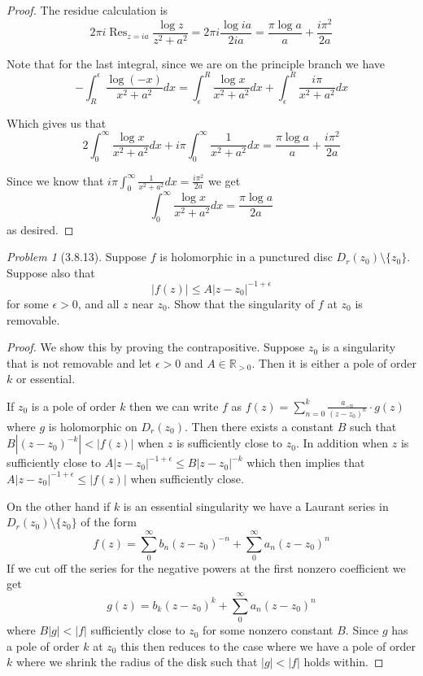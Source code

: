 \documentclass[10pt]{article}
\newcommand{\sk}{\vskip 10mm}
\newcommand{\bb}[1]{\mathbb{#1}}
\DeclareMathOperator{\Res}{Res}
\theoremstyle{remark}
\newtheorem{problem}{Problem}
\theoremstyle{remark}
\begin{document}
\begin{proof}
  The residue calculation is
  \[
    2\pi i\Res_{z=ia}\frac{\log z}{z^2+a^2}= 2\pi i\frac{\log ia}{2ia} = \frac{\pi\log a}{a}+\frac{i\pi^2}{2a}
  \]

  Note that for the last integral, since we are on the principle branch we have
  \[
    -\int_{R}^{\epsilon}\frac{\log (-x)}{x^2+a^2}dx =\int_\epsilon^R\frac{\log x}{x^2+a^2}dx+\int_\epsilon^R\frac{i\pi}{x^2+a^2}dx
  \]
  
  Which gives us that
  \[
    2\int_0^\infty\frac{\log x}{x^2+a^2}dx+i\pi\int_0^\infty\frac{1}{x^2+a^2}dx = \frac{\pi\log a}{a}+\frac{i\pi^2}{2a}
  \]

  Since we know that $i\pi\int_0^\infty\frac{1}{x^2+a^2}dx = \frac{i\pi^2}{2a}$ we get
  \[
    \int_0^\infty\frac{\log x}{x^2+a^2}dx=\frac{\pi\log a}{2a}
  \]
  as desired.
\end{proof}

\sk

\begin{problem}[3.8.13]
  Suppose $f$ is holomorphic in a punctured disc $D_r(z_0)\setminus\{z_0\}$.
  Suppose also that
  \[
    |f(z)|\leq A|z-z_0|^{-1+\epsilon}
  \]
  for some $\epsilon>0$, and all $z$ near $z_0$. Show that the singularity
  of $f$ at $z_0$ is removable.
\end{problem}

\begin{proof}
  We show this by proving the contrapositive. Suppose $z_0$ is a singularity
  that is not removable and let $\epsilon>0$ and $A\in\bb{R}_{>0}$.
  Then it is either a pole of order $k$ or essential.

  If $z_0$ is a pole of order $k$ then we can write $f$ as
  $f(z)=\sum_{n=0}^k\frac{a_{-n}}{(z-z_0)^{n}}\cdot g(z)$ where $g$ is holomorphic on
  $D_r(z_0)$. Then there exists a constant $B$ such that $B|(z-z_0)^{-k}|<|f(z)|$
  when $z$ is sufficiently close to $z_0$. In addition when $z$ is sufficiently
  close to $A|z-z_0|^{-1+\epsilon}\leq B|z-z_0|^{-k}$ which then implies that
  $A|z-z_0|^{-1+\epsilon}\leq|f(z)|$ when sufficiently close.

  On the other hand if $k$ is an essential singularity we have a Laurant
  series in $D_r(z_0)\setminus\{z_0\}$ of the form
  \[
    f(z)=\sum_0^\infty b_n(z-z_0)^{-n} +\sum_0^\infty a_n(z-z_0)^n
  \]
  If we cut off the series for the negative powers at the first nonzero coefficient
  we get
  \[
    g(z)=b_k(z-z_0)^k+\sum_0^\infty a_n(z-z_0)^n
  \]
  where $B|g|<|f|$ sufficiently close to $z_0$ for some nonzero constant $B$. Since
  $g$ has a pole of order $k$ at $z_0$ this then reduces to the case where we have a
  pole of order $k$ where we shrink the radius of the disk such that $|g|<|f|$ holds within.
\end{proof}
\end{document}
